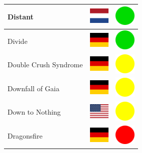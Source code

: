 \documentclass[12pt, a4paper, twoside]{report}
\begin{document}
\begin{center}
\begin{longtable}{|p{5cm}|p{2cm}|p{2cm}|}
Distant & \includegraphics[width=1cm]{4x3/nl} & \includegraphics[width=1cm]{likes/y} \\ \hline
Divide & \includegraphics[width=1cm]{4x3/de} & \includegraphics[width=1cm]{likes/y} \\ \hline
Double Crush Syndrome & \includegraphics[width=1cm]{4x3/de} & \includegraphics[width=1cm]{likes/m} \\ \hline
Downfall of Gaia & \includegraphics[width=1cm]{4x3/de} & \includegraphics[width=1cm]{likes/m} \\ \hline
Down to Nothing & \includegraphics[width=1cm]{4x3/us} & \includegraphics[width=1cm]{likes/m} \\ \hline
Dragonsfire & \includegraphics[width=1cm]{4x3/de} & \includegraphics[width=1cm]{likes/n} \\ \hline

\end{longtable}
\end{center}
\end{document}
